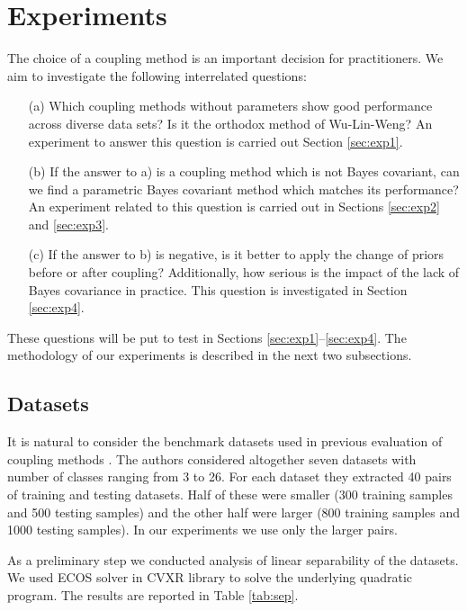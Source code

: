 \section{Experiments}

The choice of a coupling method is an important decision for practitioners. We aim to investigate the following interrelated questions:

\begin{itemize}
	\item[(a)] Which coupling methods without parameters show good performance across diverse data sets? Is it the orthodox method of Wu-Lin-Weng? An experiment to answer this question is carried out Section \ref{sec:exp1}. 
	\item[(b)] If the answer to a) is a coupling method which is not Bayes covariant, can we find a parametric Bayes covariant method which  matches its performance? An experiment related to this question is carried out in  Sections \ref{sec:exp2} and \ref{sec:exp3}.
	\item[(c)] If the answer to b) is negative, is it better to apply the change of priors before or after coupling? Additionally, how serious is the impact of the lack of Bayes covariance in practice. This question is investigated in Section \ref{sec:exp4}.
\end{itemize}

These questions will be put to test in Sections \ref{sec:exp1}--\ref{sec:exp4}. The methodology of our experiments is described in the next two subsections.

\subsection{Datasets}

It is natural to consider the benchmark datasets used in previous evaluation of coupling methods \cite{wu2004probability}. The authors considered altogether seven datasets with number of classes ranging from 3 to 26. For each dataset they extracted 40 pairs of training and testing datasets. Half of these were smaller (300 training samples and 500 testing samples) and the other half were larger (800 training samples and 1000 testing samples). In our experiments we use only the larger pairs. 

As a preliminary step we conducted analysis of linear separability of the datasets. We used ECOS solver in CVXR library to solve the underlying quadratic program. The results are reported in Table \ref{tab:sep}.

